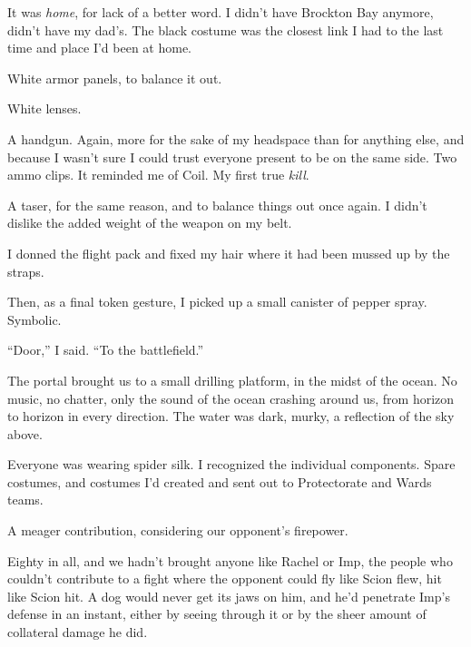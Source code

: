 It was \emph{home}, for lack of a better word.  I didn't have Brockton Bay anymore, didn't have my dad's.  The black costume was the closest link I had to the last time and place I'd been at home.



White armor panels, to balance it out.



White lenses.



A handgun.  Again, more for the sake of my headspace than for anything else, and because I wasn't sure I could trust everyone present to be on the same side.  Two ammo clips.  It reminded me of Coil.  My first true \emph{kill}.



A taser, for the same reason, and to balance things out once again.  I didn't dislike the added weight of the weapon on my belt.



I donned the flight pack and fixed my hair where it had been mussed up by the straps.



Then, as a final token gesture, I picked up a small canister of pepper spray.  Symbolic.



``Door,'' I said.  ``To the battlefield.''



\blacksquare



The portal brought us to a small drilling platform, in the midst of the ocean.  No music, no chatter, only the sound of the ocean crashing around us, from horizon to horizon in every direction.  The water was dark, murky, a reflection of the sky above.



Everyone was wearing spider silk.  I recognized the individual components.  Spare costumes, and costumes I'd created and sent out to Protectorate and Wards teams.



A meager contribution, considering our opponent's firepower.



Eighty in all, and we hadn't brought anyone like Rachel or Imp, the people who couldn't contribute to a fight where the opponent could fly like Scion flew, hit like Scion hit.  A dog would never get its jaws on him, and he'd penetrate Imp's defense in an instant, either by seeing through it or by the sheer amount of collateral damage he did.



